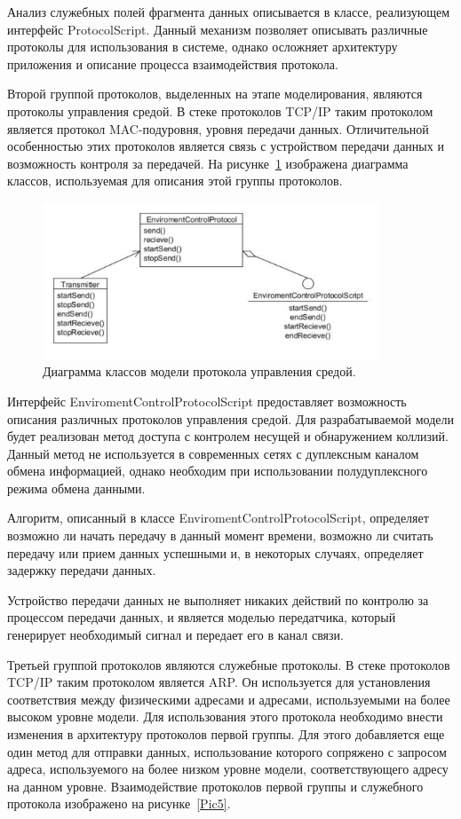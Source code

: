 \documentclass[12pt]{report}
\begin{document}
    Анализ служебных полей фрагмента данных описывается в классе, реализующем интерфейс ProtocolScript. Данный механизм позволяет описывать различные протоколы для использования в системе, однако осложняет архитектуру приложения и описание процесса взаимодействия протокола.

    Второй группой протоколов, выделенных на этапе моделирования, являются протоколы управления средой. В стеке протоколов TCP/IP таким протоколом является протокол MAC-подуровня, уровня передачи данных. Отличительной особенностью этих протоколов является связь с устройством передачи данных и возможность контроля за передачей. На рисунке~\ref{Pic4} изображена диаграмма классов, используемая для описания этой группы протоколов.

    \begin{figure}[h!]\center
        \includegraphics[width = 100mm]{Ch3Pic4}
        \caption{Диаграмма классов модели протокола управления средой. } \label{Pic4}
    \end{figure}

    Интерфейс EnviromentControlProtocolScript предоставляет возможность описания различных протоколов управления средой. Для разрабатываемой модели будет реализован метод доступа с контролем несущей и обнаружением коллизий. Данный метод не используется в современных сетях с дуплексным каналом обмена информацией, однако необходим при использовании полудуплексного режима обмена данными.

    Алгоритм, описанный в классе EnviromentControlProtocolScript, определяет возможно ли начать передачу в данный момент времени, возможно ли считать передачу или прием данных успешными и, в некоторых случаях, определяет задержку передачи данных.

    Устройство передачи данных не выполняет никаких действий по контролю за процессом передачи данных, и является моделью передатчика, который генерирует необходимый сигнал и передает его в канал связи.

    Третьей группой протоколов являются служебные протоколы. В стеке протоколов TCP/IP таким протоколом является ARP. Он используется для установления соответствия между физическими адресами и адресами, используемыми на более высоком уровне модели. Для использования этого протокола необходимо внести изменения в архитектуру протоколов первой группы. Для этого добавляется еще один метод для отправки данных, использование которого сопряжено с запросом адреса, используемого на более низком уровне модели, соответствующего адресу на данном уровне. Взаимодействие протоколов первой группы и служебного протокола изображено на рисунке~\ref{Pic5}.
    
\end{document}
